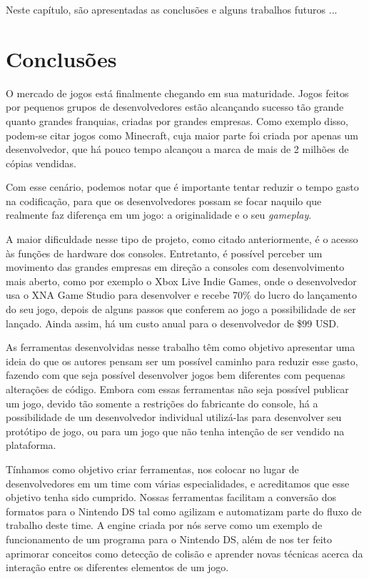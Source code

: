 \documentclass[brazil]{abnt}
\begin{document}
Neste capítulo, são apresentadas as conclusões e alguns trabalhos futuros
...
\newpage


\section{Conclusões}

O mercado de jogos está finalmente chegando em sua maturidade. Jogos feitos por pequenos grupos de desenvolvedores estão alcançando sucesso tão grande quanto grandes franquias, criadas por grandes empresas. Como exemplo disso, podem-se citar jogos como Minecraft, cuja maior parte foi criada por apenas um desenvolvedor, que há pouco tempo alcançou a marca de mais de 2 milhões de cópias vendidas. \cite{MinecraftSales}

Com esse cenário, podemos notar que é importante tentar reduzir o tempo gasto na codificação, para que os desenvolvedores possam se focar naquilo que realmente faz diferença em um jogo: a originalidade e o seu \textit{gameplay}.

A maior dificuldade nesse tipo de projeto, como citado anteriormente, é o acesso às funções de hardware dos consoles. Entretanto, é possível perceber um movimento das grandes empresas em direção a consoles com desenvolvimento mais aberto, como por exemplo o Xbox Live Indie Games, onde o desenvolvedor usa o XNA Game Studio para desenvolver e recebe 70\% do lucro do lançamento do seu jogo, depois de alguns passos que conferem ao jogo a possibilidade de ser lançado. Ainda assim, há um custo anual para o desenvolvedor de \$99 USD. \cite{XNAAppHub}

As ferramentas desenvolvidas nesse trabalho têm como objetivo apresentar uma ideia do que os autores pensam ser um possível caminho para reduzir esse gasto, fazendo com que seja possível desenvolver jogos bem diferentes com pequenas alterações de código. Embora com essas ferramentas não seja possível publicar um jogo, devido tão somente a restrições do fabricante do console, há a possibilidade de um desenvolvedor individual utilizá-las para desenvolver seu protótipo de jogo, ou para um jogo que não tenha intenção de ser vendido na plataforma.

Tínhamos como objetivo criar ferramentas, nos colocar no lugar de desenvolvedores em um time com várias especialidades, e acreditamos que esse objetivo tenha sido cumprido. Nossas ferramentas facilitam a conversão dos formatos para o Nintendo DS tal como agilizam e automatizam parte do fluxo de trabalho deste time. A engine criada por nós serve como um exemplo de funcionamento de um programa para o Nintendo DS, além de nos ter feito aprimorar conceitos como detecção de colisão e aprender novas técnicas acerca da interação entre os diferentes elementos de um jogo.
\end{document}
